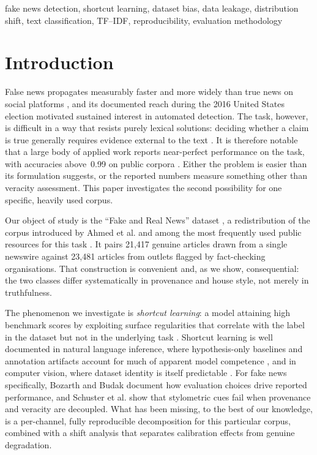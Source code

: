 \documentclass[conference]{IEEEtran}
\begin{document}
\begin{IEEEkeywords}
fake news detection, shortcut learning, dataset bias, data leakage,
distribution shift, text classification, TF--IDF, reproducibility,
evaluation methodology
\end{IEEEkeywords}

\section{Introduction}
\label{sec:intro}

False news propagates measurably faster and more widely than true news on
social platforms \cite{vosoughi2018spread}, and its documented reach during the
2016 United States election \cite{allcott2017social} motivated sustained
interest in automated detection. The task, however, is difficult in a way that
resists purely lexical solutions: deciding whether a claim is true generally
requires evidence external to the text
\cite{thorne2018fever,zhou2020survey}. It is
therefore notable that a large body of applied work reports near-perfect
performance on the task, with accuracies above~0.99 on public corpora
\cite{ahmed2017detection,ahmed2018detecting,khan2021benchmark}. Either the
problem is easier than its formulation suggests, or the reported numbers
measure something other than veracity assessment. This paper investigates the
second possibility for one specific, heavily used corpus.

Our object of study is the ``Fake and Real News'' dataset
\cite{bisaillon2020dataset}, a redistribution of the corpus introduced by
Ahmed et al. \cite{ahmed2017detection,ahmed2018detecting} and among the most
frequently used public resources for this task
\cite{khan2021benchmark}. It pairs
21{,}417 genuine articles drawn from a single newswire against 23{,}481
articles from outlets flagged by fact-checking organisations. That construction
is convenient and, as we show, consequential: the two classes differ
systematically in provenance and house style, not merely in truthfulness.

The phenomenon we investigate is \emph{shortcut learning}: a model attaining
high benchmark scores by exploiting surface regularities that correlate with
the label in the dataset but not in the underlying task
\cite{geirhos2020shortcut}. Shortcut learning is well documented in natural
language inference, where hypothesis-only baselines and annotation artifacts
account for much of apparent model competence
\cite{gururangan2018annotation,poliak2018hypothesis,mccoy2019right,niven2019probing},
and in computer vision, where dataset identity is itself predictable
\cite{torralba2011unbiased}. For fake news specifically, Bozarth and Budak
\cite{bozarth2020toward} document how evaluation choices drive reported
performance, and Schuster et al. \cite{schuster2020limitations} show that
stylometric cues fail when provenance and veracity are decoupled. What has been
missing, to the best of our knowledge, is a per-channel, fully reproducible
decomposition for this particular corpus, combined with a shift analysis that
separates calibration effects from genuine degradation.
\end{document}
